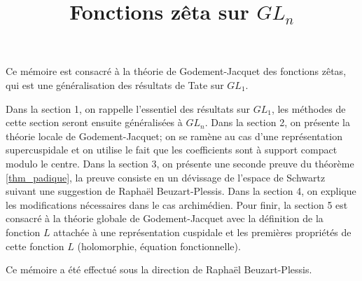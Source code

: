 \documentclass{amsart}
\begin{document}
\title{Fonctions zêta sur $GL_n$}
\maketitle

Ce mémoire est consacré à la théorie de Godement-Jacquet \cite{godement-jacquet} des fonctions zêtas, qui est une généralisation des résultats de Tate \cite{tate} sur $GL_1$.

Dans la section 1, on rappelle l'essentiel des résultats sur $GL_1$, les méthodes de cette section seront ensuite généralisées à $GL_n$. Dans la section 2, on présente la théorie locale de Godement-Jacquet; on se ramène au cas d'une représentation supercuspidale et on utilise le fait que les coefficients sont à support compact modulo le centre. Dans la section 3, on présente une seconde preuve du théorème \ref{thm_padique}, la preuve consiste en un dévissage de l'espace de Schwartz suivant une suggestion de Raphaël Beuzart-Plessis. Dans la section 4, on explique les modifications nécessaires dans le cas archimédien. Pour finir, la section 5 est consacré à la théorie globale de Godement-Jacquet avec la définition de la fonction $L$ attachée à une représentation cuspidale et les premières propriétés de cette fonction $L$ (holomorphie, équation fonctionnelle).

Ce mémoire a été effectué sous la direction de Raphaël Beuzart-Plessis.

\tableofcontents











 
\end{document}
